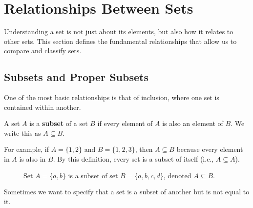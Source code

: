 \section{Relationships Between Sets}
Understanding a set is not just about its elements, but also how it relates to other sets. This section defines the fundamental relationships that allow us to compare and classify sets.

\subsection*{Subsets and Proper Subsets}
One of the most basic relationships is that of inclusion, where one set is contained within another.

\begin{definition}[Subset]
    A set $A$ is a \textbf{subset} of a set $B$ if every element of $A$ is also an element of $B$. We write this as $A \subseteq B$.
\end{definition}

For example, if $A = \{1, 2\}$ and $B = \{1, 2, 3\}$, then $A \subseteq B$ because every element in $A$ is also in $B$. By this definition, every set is a subset of itself (i.e., $A \subseteq A$).

\begin{figure}[htbp]
    \centering
    \caption{Set $A = \{a, b\}$ is a subset of set $B = \{a, b, c, d\}$, denoted $A \subseteq B$.}
    \label{fig:subset}
\end{figure}

Sometimes we want to specify that a set is a subset of another but is not equal to it.

